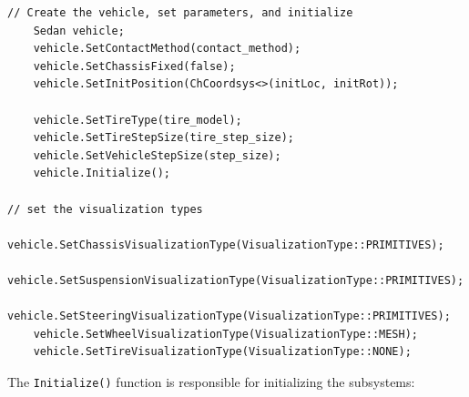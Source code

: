 \begin{lstlisting}
// Create the vehicle, set parameters, and initialize
    Sedan vehicle;
    vehicle.SetContactMethod(contact_method);
    vehicle.SetChassisFixed(false);
    vehicle.SetInitPosition(ChCoordsys<>(initLoc, initRot));
    
    vehicle.SetTireType(tire_model);
    vehicle.SetTireStepSize(tire_step_size);
    vehicle.SetVehicleStepSize(step_size);
    vehicle.Initialize();

// set the visualization types
    vehicle.SetChassisVisualizationType(VisualizationType::PRIMITIVES); 
    vehicle.SetSuspensionVisualizationType(VisualizationType::PRIMITIVES); 
    vehicle.SetSteeringVisualizationType(VisualizationType::PRIMITIVES); 
    vehicle.SetWheelVisualizationType(VisualizationType::MESH); 
    vehicle.SetTireVisualizationType(VisualizationType::NONE); 
\end{lstlisting}

The \lstinline{Initialize()} function is responsible for initializing the subsystems:

